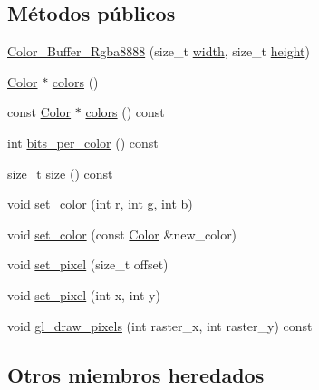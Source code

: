 \subsection*{Métodos públicos}
\begin{DoxyCompactItemize}
\item 
\mbox{\hyperlink{classexample_1_1_color___buffer___rgba8888_aa5397ac3ceb62d95d0f4773205d98177}{Color\+\_\+\+Buffer\+\_\+\+Rgba8888}} (size\+\_\+t \mbox{\hyperlink{classexample_1_1_color___buffer_ab61454d4b35cbba00d2e634d14ed20ac}{width}}, size\+\_\+t \mbox{\hyperlink{classexample_1_1_color___buffer_ae01f4538ee30af1d3072a425c5ad37ac}{height}})
\item 
\mbox{\hyperlink{structexample_1_1_color___buffer___rgba8888_1_1_color}{Color}} $\ast$ \mbox{\hyperlink{classexample_1_1_color___buffer___rgba8888_aec3a6be699750106d4a9ccd5f7f75f74}{colors}} ()
\item 
const \mbox{\hyperlink{structexample_1_1_color___buffer___rgba8888_1_1_color}{Color}} $\ast$ \mbox{\hyperlink{classexample_1_1_color___buffer___rgba8888_aea57e24bede44fa736473824e8f14a1f}{colors}} () const
\item 
int \mbox{\hyperlink{classexample_1_1_color___buffer___rgba8888_ab2e7a20a9dd24c5dd422d143d9a2d391}{bits\+\_\+per\+\_\+color}} () const
\item 
size\+\_\+t \mbox{\hyperlink{classexample_1_1_color___buffer___rgba8888_a635f30dda6b8e1851b444ff6e0d2a092}{size}} () const
\item 
void \mbox{\hyperlink{classexample_1_1_color___buffer___rgba8888_a408bf6adf54fc9958b74d21c8f6da178}{set\+\_\+color}} (int r, int g, int b)
\item 
void \mbox{\hyperlink{classexample_1_1_color___buffer___rgba8888_a5033d0d18293c92936fd2ff5318e3f0f}{set\+\_\+color}} (const \mbox{\hyperlink{structexample_1_1_color___buffer___rgba8888_1_1_color}{Color}} \&new\+\_\+color)
\item 
void \mbox{\hyperlink{classexample_1_1_color___buffer___rgba8888_ac741fa7bca9b980a475e6f7033b64347}{set\+\_\+pixel}} (size\+\_\+t offset)
\item 
void \mbox{\hyperlink{classexample_1_1_color___buffer___rgba8888_aceb94fbc6797177c5a401f4d10d56766}{set\+\_\+pixel}} (int x, int y)
\item 
void \mbox{\hyperlink{classexample_1_1_color___buffer___rgba8888_a66e133b6fd196f02a0ba454dd3fc550f}{gl\+\_\+draw\+\_\+pixels}} (int raster\+\_\+x, int raster\+\_\+y) const
\end{DoxyCompactItemize}
\subsection*{Otros miembros heredados}


